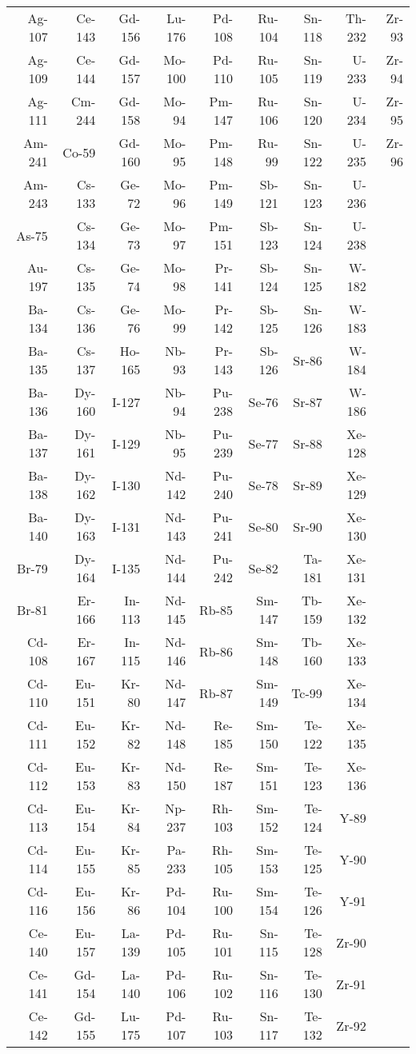\begin{appendices}
\begin{table}[h!]
  \begin{tabular}{|r|r|r|r|r|r|r|r|r|}
    \toprule
    Ag-107 & Ce-143 & Gd-156 & Lu-176 & Pd-108 & Ru-104 & Sn-118 & Th-232 & Zr-93 \\
    Ag-109 & Ce-144 & Gd-157 & Mo-100 & Pd-110 & Ru-105 & Sn-119 & U-233 & Zr-94 \\
    Ag-111 & Cm-244 & Gd-158 & Mo-94 & Pm-147 & Ru-106 & Sn-120 & U-234 & Zr-95 \\
    Am-241 & Co-59 & Gd-160 & Mo-95 & Pm-148 & Ru-99 & Sn-122 & U-235 & Zr-96 \\
    Am-243 & Cs-133 & Ge-72 & Mo-96 & Pm-149 & Sb-121 & Sn-123 & U-236 & \\
    As-75 & Cs-134 & Ge-73 & Mo-97 & Pm-151 & Sb-123 & Sn-124 & U-238 & \\
    Au-197 & Cs-135 & Ge-74 & Mo-98 & Pr-141 & Sb-124 & Sn-125 & W-182 & \\
    Ba-134 & Cs-136 & Ge-76 & Mo-99 & Pr-142 & Sb-125 & Sn-126 & W-183 & \\
    Ba-135 & Cs-137 & Ho-165 & Nb-93 & Pr-143 & Sb-126 & Sr-86 & W-184 & \\
    Ba-136 & Dy-160 & I-127 & Nb-94 & Pu-238 & Se-76 & Sr-87 & W-186 & \\
    Ba-137 & Dy-161 & I-129 & Nb-95 & Pu-239 & Se-77 & Sr-88 & Xe-128 & \\
    Ba-138 & Dy-162 & I-130 & Nd-142 & Pu-240 & Se-78 & Sr-89 & Xe-129 & \\
    Ba-140 & Dy-163 & I-131 & Nd-143 & Pu-241 & Se-80 & Sr-90 & Xe-130 & \\
    Br-79 & Dy-164 & I-135 & Nd-144 & Pu-242 & Se-82 & Ta-181 & Xe-131 & \\
    Br-81 & Er-166 & In-113 & Nd-145 & Rb-85 & Sm-147 & Tb-159 & Xe-132 & \\
    Cd-108 & Er-167 & In-115 & Nd-146 & Rb-86 & Sm-148 & Tb-160 & Xe-133 & \\
    Cd-110 & Eu-151 & Kr-80 & Nd-147 & Rb-87 & Sm-149 & Tc-99 & Xe-134 & \\
    Cd-111 & Eu-152 & Kr-82 & Nd-148 & Re-185 & Sm-150 & Te-122 & Xe-135 & \\
    Cd-112 & Eu-153 & Kr-83 & Nd-150 & Re-187 & Sm-151 & Te-123 & Xe-136 & \\
    Cd-113 & Eu-154 & Kr-84 & Np-237 & Rh-103 & Sm-152 & Te-124 & Y-89 & \\
    Cd-114 & Eu-155 & Kr-85 & Pa-233 & Rh-105 & Sm-153 & Te-125 & Y-90 & \\
    Cd-116 & Eu-156 & Kr-86 & Pd-104 & Ru-100 & Sm-154 & Te-126 & Y-91 & \\
    Ce-140 & Eu-157 & La-139 & Pd-105 & Ru-101 & Sn-115 & Te-128 & Zr-90 & \\
    Ce-141 & Gd-154 & La-140 & Pd-106 & Ru-102 & Sn-116 & Te-130 & Zr-91 & \\
    Ce-142 & Gd-155 & Lu-175 & Pd-107 & Ru-103 & Sn-117 & Te-132 & Zr-92 & \\
    \bottomrule
  \end{tabular}
\end{table}

\end{appendices}
